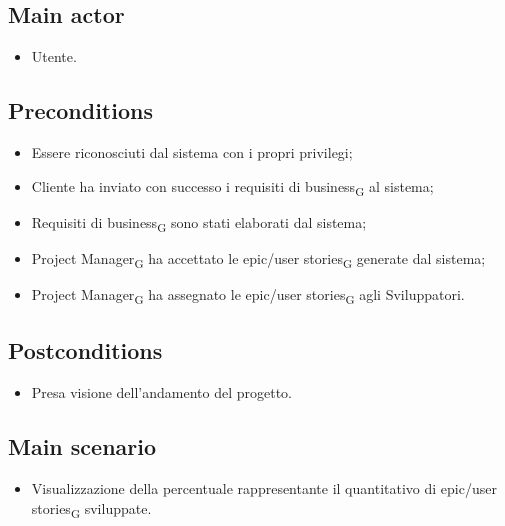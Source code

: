 \documentclass{article}
\begin{document}
    \subsection*{Main actor}
        \begin{itemize}
            \item Utente.
        \end{itemize}
        
    \subsection*{Preconditions}
        \begin{itemize}
            \item Essere riconosciuti dal sistema con i propri privilegi;
            \item Cliente ha inviato con successo i requisiti di business\textsubscript{G} al sistema;
            \item Requisiti di business\textsubscript{G} sono stati elaborati dal sistema;
            \item Project Manager\textsubscript{G} ha accettato le epic/user stories\textsubscript{G} generate dal sistema;
            \item Project Manager\textsubscript{G} ha assegnato le epic/user stories\textsubscript{G} agli Sviluppatori.
        \end{itemize}
        
    \subsection*{Postconditions}
        \begin{itemize}
            \item Presa visione dell'andamento del progetto.
        \end{itemize}
        
    \subsection*{Main scenario}
        
        \begin{itemize}
            \item Visualizzazione della percentuale rappresentante il quantitativo di epic/user stories\textsubscript{G} sviluppate.
        \end{itemize}
        
\end{document}
